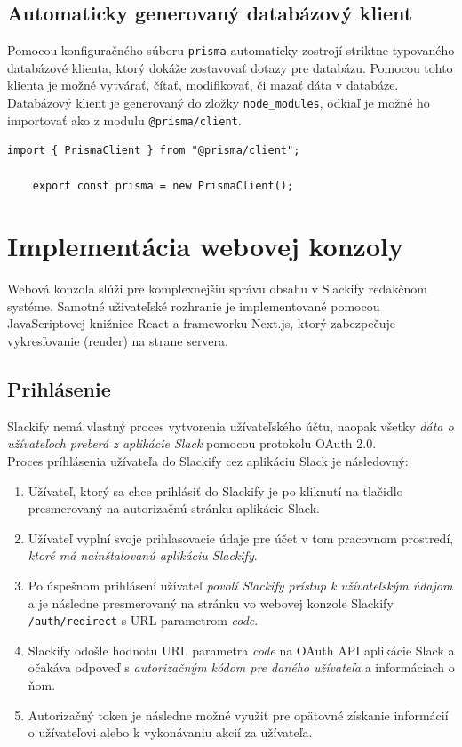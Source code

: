 \section{Automaticky generovaný databázový klient}
Pomocou konfiguračného súboru \texttt{prisma} automaticky zostrojí striktne typovaného databázové klienta, ktorý dokáže zostavovať dotazy pre databázu. Pomocou tohto klienta je možné vytvárať, čítať, modifikovať, či mazať dáta v databáze. \\

\noindent Databázový klient je generovaný do zložky \texttt{node\_modules}, odkiaľ je možné ho importovať ako z modulu \texttt{@prisma/client}. \\

\begin{lstlisting}[caption=Príklad vytvorenia instancie databázového klienta v Slackify.]
	import { PrismaClient } from "@prisma/client";

	export const prisma = new PrismaClient();
\end{lstlisting}

\chapter{Implementácia webovej konzoly}
Webová konzola slúži pre komplexnejšiu správu obsahu v Slackify redakčnom systéme. Samotné uživateľské rozhranie je implementované pomocou JavaScriptovej knižnice React a frameworku Next.js, ktorý zabezpečuje vykresľovanie (render) na strane servera.

\section{Prihlásenie}
Slackify nemá vlastný proces vytvorenia užívateľského účtu, naopak všetky \emph{dáta o užívateľoch preberá z aplikácie Slack} pomocou protokolu OAuth 2.0. \\

\noindent Proces príhlásenia užívateľa do Slackify cez aplikáciu Slack je následovný:

\begin{enumerate}
	\item Užívateľ, ktorý sa chce prihlásiť do Slackify je po kliknutí na tlačidlo  presmerovaný na autorizačnú stránku aplikácie Slack.
	\item Užívateľ vyplní svoje prihlasovacie údaje pre účet v tom pracovnom prostredí, \emph{ktoré má nainštalovanú aplikáciu Slackify}.
	\item Po úspešnom prihlásení užívateľ \emph{povolí Slackify prístup k užívateľským údajom} a je následne presmerovaný na stránku vo webovej konzole Slackify \texttt{/auth/redirect} s URL parametrom \textit{code}.
	\item Slackify odošle hodnotu URL parametra \textit{code} na OAuth API aplikácie Slack a očakáva odpoveď s \emph{autorizačným kódom pre daného užívateľa} a informáciach o ňom.
	\item Autorizačný token je následne možné využiť pre opätovné získanie informácií o užívateľovi alebo k vykonávaniu akcií za užívateľa.
\end{enumerate}

